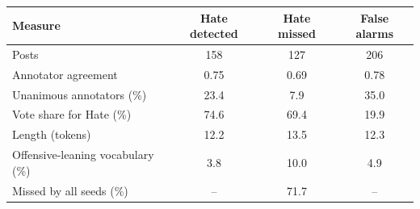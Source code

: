 \begin{tabular}{lccc}
\toprule
Measure & Hate detected & Hate missed & False alarms \\
\midrule
Posts & 158 & 127 & 206 \\
Annotator agreement & 0.75 & 0.69 & 0.78 \\
Unanimous annotators (\%) & 23.4 & 7.9 & 35.0 \\
Vote share for Hate (\%) & 74.6 & 69.4 & 19.9 \\
Length (tokens) & 12.2 & 13.5 & 12.3 \\
Offensive-leaning vocabulary (\%) & 3.8 & 10.0 & 4.9 \\
Missed by all seeds (\%) & -- & 71.7 & -- \\
\bottomrule
\end{tabular}
